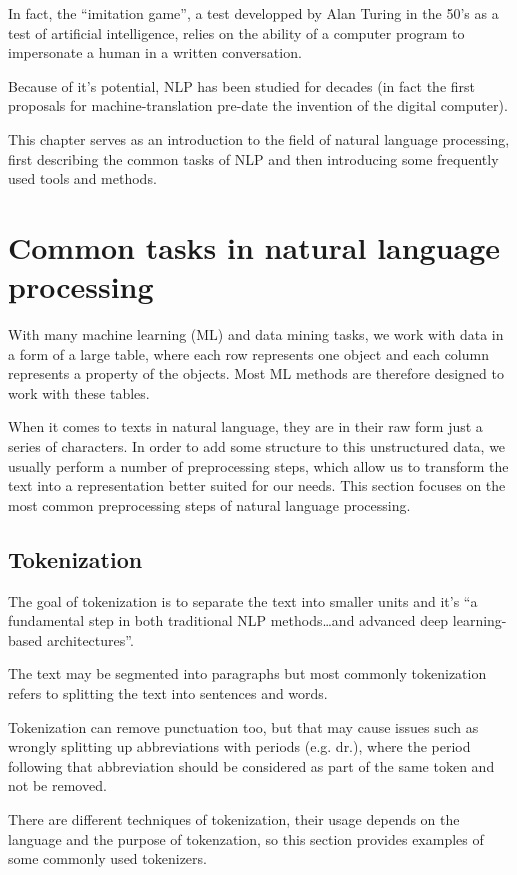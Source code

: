 In fact, the ``imitation game'', a test developped by Alan Turing in the 50's as a test of artificial intelligence, relies on the ability of a computer program to impersonate a human in a written conversation.\cite{turing}


Because of it's potential, NLP has been studied for decades (in fact the first proposals for machine-translation pre-date the invention of the digital computer\cite{nlp_history}). 

This chapter serves as an introduction to the field of natural language processing, first describing the common tasks of NLP and then introducing some frequently used tools and methods.
\section{Common tasks in natural language processing}
With many machine learning (ML) and data mining tasks, we work with data in a form of a large table, where each row represents one object and each column represents a property of the objects. Most ML methods are therefore designed to work with these tables. 

When it comes to texts in natural language, they are in their raw form just a series of characters. In order to add some structure to this unstructured data, we usually perform a number of preprocessing steps, which allow us to transform the text into a representation better suited for our needs. This section focuses on the most common preprocessing steps of natural language processing.

\subsection{Tokenization}
The goal of tokenization is to separate the text into smaller units and it's ``a fundamental step in both traditional NLP methods\ldots and advanced deep learning-based architectures''.\cite{tokenization}

The text may be segmented into paragraphs but most commonly tokenization refers to splitting the text into sentences and words. 

Tokenization can remove punctuation too, but that may cause issues such as wrongly splitting up abbreviations with periods (e.g. dr.), where the period following that abbreviation should be considered as part of the same token and not be removed.\cite{nlp_tasks}

There are different techniques of tokenization, their usage depends on the language and the purpose of tokenzation, so this section provides examples of some commonly used tokenizers.
